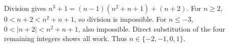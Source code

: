 Division gives $n^3+1=(n-1)(n^2+n+1)+(n+2)$. For $n\ge2$, $0<n+2<n^2+n+1$, so division is impossible. For $n\le-3$, $0<|n+2|<n^2+n+1$, also impossible. Direct substitution of the four remaining integers shows all work. Thus $\boxed{n\in\{-2,-1,0,1\}}$.
